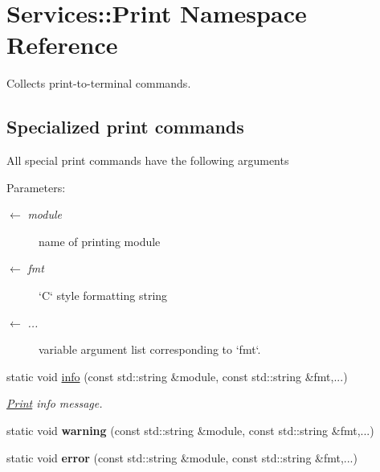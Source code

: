 \hypertarget{namespaceServices_1_1Print}{
\section{Services::Print Namespace Reference}
\label{namespaceServices_1_1Print}
}
Collects print-to-terminal commands.  


\subsection*{Specialized print commands}
All special print commands have the following arguments

\begin{Desc}
\item[Parameters:]
\begin{description}
\item[\mbox{$\leftarrow$} {\em module}]name of printing module \item[\mbox{$\leftarrow$} {\em fmt}]`C` style formatting string \item[\mbox{$\leftarrow$} {\em ...}]variable argument list corresponding to `fmt`. \end{description}
\end{Desc}
\begin{CompactItemize}
\item 
\hypertarget{namespaceServices_1_1Print_6967d6744e1e2798ee7ab0ed6e0a396d}{
static void \hyperlink{namespaceServices_1_1Print_6967d6744e1e2798ee7ab0ed6e0a396d}{info} (const std::string \&module, const std::string \&fmt,...)}
\label{namespaceServices_1_1Print_6967d6744e1e2798ee7ab0ed6e0a396d}

\begin{CompactList}\small\item\em \hyperlink{namespaceServices_1_1Print}{Print} info message. \item\end{CompactList}\item 
\hypertarget{namespaceServices_1_1Print_ac8e374dd4ad68695b8aeaccf4f21af6}{
static void \textbf{warning} (const std::string \&module, const std::string \&fmt,...)}
\label{namespaceServices_1_1Print_ac8e374dd4ad68695b8aeaccf4f21af6}

\item 
\hypertarget{namespaceServices_1_1Print_8abe8eea7986b4dcf29283093ca91b33}{
static void \textbf{error} (const std::string \&module, const std::string \&fmt,...)}
\label{namespaceServices_1_1Print_8abe8eea7986b4dcf29283093ca91b33}

\end{CompactItemize}
